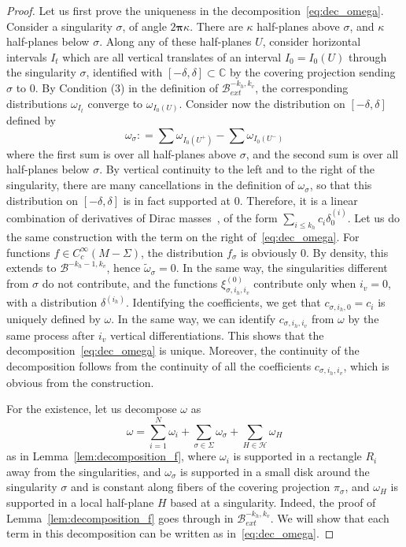 \documentclass[11pt, a4paper, oneside, final, pagebackref]{amsart}
\newcommand{\boH}{\mathcal{H}}
\newcommand{\boB}{\mathcal{B}}
\newcommand{\C}{\mathbb{C}}
\newcommand{\bpi}{\boldsymbol{\pi}}
\newcommand{\coloneqq}{\mathrel{\mathop:}=}
\renewcommand{\leq}{\leqslant}
\theoremstyle{definition}
\numberwithin{equation}{section}
\begin{document}
\begin{proof}
Let us first prove the uniqueness in the decomposition~\eqref{eq:dec_omega}.
Consider a singularity $\sigma$, of angle $2\bpi\kappa$. There are $\kappa$
half-planes above $\sigma$, and $\kappa$ half-planes below $\sigma$. Along
any of these half-planes $U$, consider horizontal intervals $I_t$ which are
all vertical translates of an interval $I_0=I_0(U)$ through the singularity
$\sigma$, identified with $[-\delta,\delta] \subset \C$ by the covering
projection sending $\sigma$ to $0$. By Condition (3) in the definition of
$\boB_{ext}^{-k_h, k_v}$, the corresponding distributions $\omega_{I_t}$
converge to $\omega_{I_0(U)}$. Consider now the distribution on
$[-\delta,\delta]$ defined by
\begin{equation*}
  \omega_\sigma \coloneqq \sum \omega_{I_0(U^+)} - \sum \omega_{I_0(U^-)}
\end{equation*}
where the first sum is over all half-planes above $\sigma$, and the second
sum is over all half-planes below $\sigma$. By vertical continuity to the
left and to the right of the singularity, there are many cancellations in the
definition of $\omega_\sigma$, so that this distribution on $[-\delta,
\delta]$ is in fact supported at $0$. Therefore, it is a linear combination
of derivatives of Dirac masses~\cite[Theorem~2.3.4]{hormander}, of the form
$\sum_{i\leq k_h} c_i \delta^{(i)}_0$. Let us do the same construction with
the term on the right of~\eqref{eq:dec_omega}. For functions $f \in
C^\infty_c(M-\Sigma)$, the distribution $f_\sigma$ is obviously $0$. By
density, this extends to $\boB^{-k_h-1, k_v}$, hence $\tilde \omega_\sigma =
0$. In the same way, the singularities different from $\sigma$ do not
contribute, and the functions $\xi^{(0)}_{\sigma, i_h, i_v}$ contribute only
when $i_v = 0$, with a distribution $\delta^{(i_h)}$. Identifying the
coefficients, we get that $c_{\sigma, i_h, 0} = c_i$ is uniquely defined by
$\omega$. In the same way, we can identify $c_{\sigma, i_h, i_v}$ from
$\omega$ by the same process after $i_v$ vertical differentiations. This
shows that the decomposition~\eqref{eq:dec_omega} is unique. Moreover, the
continuity of the decomposition follows from the continuity of all the
coefficients $c_{\sigma, i_h, i_v}$, which is obvious from the construction.

For the existence, let us decompose $\omega$ as
\begin{equation*}
  \omega = \sum_{i=1}^N \omega_i + \sum_{\sigma\in \Sigma} \omega_\sigma + \sum_{H \in \boH} \omega_H
\end{equation*}
as in Lemma~\ref{lem:decomposition_f}, where $\omega_i$ is supported in a
rectangle $R_i$ away from the singularities, and $\omega_\sigma$ is supported
in a small disk around the singularity $\sigma$ and is constant along fibers
of the covering projection $\pi_\sigma$, and $\omega_H$ is supported in a
local half-plane $H$ based at a singularity. Indeed, the proof of
Lemma~\ref{lem:decomposition_f} goes through in $\boB^{-k_h, k_v}_{ext}$. We
will show that each term in this decomposition can be written as
in~\eqref{eq:dec_omega}.


\end{proof}
\end{document}
